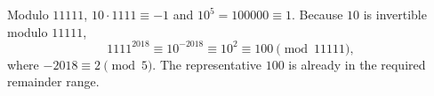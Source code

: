Modulo $11111$, $10\cdot1111\equiv-1$ and $10^5=100000\equiv1$. Because $10$ is invertible modulo $11111$,
\[
1111^{2018}\equiv10^{-2018}\equiv10^2\equiv\boxed{100}\pmod{11111},
\]
where $-2018\equiv2\pmod5$. The representative $100$ is already in the required remainder range.
